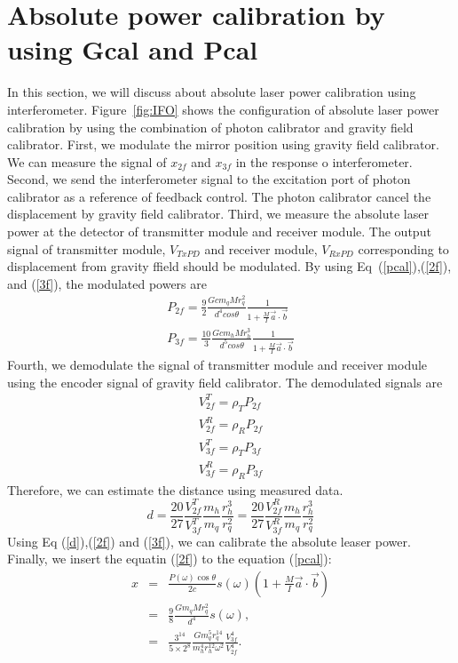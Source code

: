 \documentclass[12pt]{iopart}
\begin{document}
\section{Absolute power calibration by using Gcal and Pcal}
In this section, we will discuss about absolute laser power calibration using interferometer. 
Figure~\ref{fig:IFO} shows the configuration of absolute laser power calibration by using the combination of photon calibrator and gravity field calibrator.
First, we modulate the mirror position using gravity field calibrator. We can measure the signal of $x_{2f}$ and $x_{3f}$ in the response o interferometer. Second, we send the interferometer signal to the excitation port of photon calibrator as a reference of feedback control. The photon calibrator cancel the displacement by gravity field calibrator. Third, we measure the absolute laser power at the detector of transmitter module and receiver module. The output signal of transmitter module, $V_{TxPD}$ and receiver module, $V_{RxPD}$ corresponding to displacement from gravity ffield should be modulated. By using Eq~(\ref{pcal}),(\ref{2f}), and (\ref{3f}), the modulated powers are
\begin{eqnarray}
 P_{2f}=\frac{9}{2} \frac{Gcm_{q}Mr_{q}^2}{d^4cos\theta}\frac{1}{1+\frac{M}{I}\vec{a}\cdot \vec{b}} \label{2f} \\
 P_{3f}= \frac{10}{3} \frac{Gcm_{h}Mr_{h}^3}{d^5cos\theta}\frac{1}{1+\frac{M}{I}\vec{a}\cdot \vec{b}} \label{3f}
\end{eqnarray}
Fourth, we demodulate the signal of transmitter module and receiver module using the encoder signal of gravity field calibrator.
The demodulated signals are 
\begin{eqnarray}
V_{2f}^{T}=\rho_{T}P_{2f} \\
V_{2f}^{R}=\rho_{R}P_{2f} \\
V_{3f}^{T}=\rho_{T}P_{3f} \\
V_{3f}^{R}=\rho_{R}P_{3f} 
\end{eqnarray} 
Therefore, we can estimate the distance using measured data. 
\begin{equation}
d=\frac{20}{27} \frac{V_{2f}^T}{V_{3f}^T}\frac{m_{h}}{m_{q}}\frac{r_{h}^{3}}{r_{q}^{2}}=\frac{20}{27} \frac{V_{2f}^R}{V_{3f}^R}\frac{m_{h}}{m_{q}}\frac{r_{h}^{3}}{r_{q}^{2}} \label{d}
\end{equation}
Using Eq (\ref{d}),(\ref{2f}) and (\ref{3f}), we can calibrate the absolute leaser power.
Finally, we insert the equatin (\ref{2f}) to the equation (\ref{pcal}):
\begin{eqnarray}
x&=&\frac{P(\omega) \cos{\theta}}{2c} s(\omega)\left(1+\frac{M}{I}\vec{a} \cdot \vec{b} \right) \\
 &=&\frac{9}{8}\frac{Gm_q M r_q^2}{d^4}s(\omega) , \\
 &=&\frac{3^{14}}{5 \times 2^8} \frac{G m^5_q r_{q}^{14}}{m^4_h r_h^{12} \omega^2} \frac{V_{3f}^4}{V_{2f}^4}.
\end{eqnarray}
\end{document}
